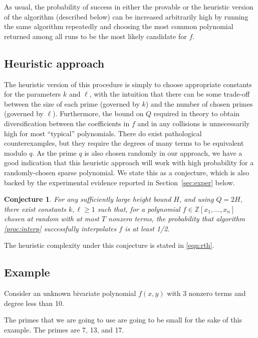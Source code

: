 \documentclass[letterpaper,10pt]{article}
\newtheorem{claim}[theorem]{Conjecture}
\newcommand{\ZZ}{\ensuremath{\mathbb{Z}}}
\begin{document}
As usual, the probability of success in either the provable or the
heuristic version of the algorithm (described below)
can be increased arbitrarily high by
running the same algorithm repeatedly and choosing the most common
polynomial returned among all runs to be the most likely candidate for
$f$.

\subsection{Heuristic approach}

The heuristic version of this procedure is simply to choose
appropriate constants for the parameters $k$ and $\ell$, with the
intuition that there can be some trade-off between the size of each prime
(governed by $k$) and the number of chosen primes (governed by $\ell$).
Furthermore, the bound on $Q$ required in theory to obtain
diversification between the coefficients in $f$ and in any collisions is
unnecessarily high for most ``typical'' polynomials. There do exist
pathological counterexamples, but they require the degrees of many terms
to be equivalent modulo $q$. As the prime $q$ is also chosen randomly in
our approach, we have a good indication that this heuristic approach
will work with high probability for a randomly-chosen sparse polynomial.
We state this as a conjecture, which is also backed by the experimental
evidence reported in Section~\ref{sec:exper} below.

\begin{claim}
  For any sufficiently large height bound $H$, and using $Q=2H$, 
  there exist constants
  $k,\ell\ge 1$ such that, for a polynomial $f\in\ZZ[x_1,\ldots,x_n]$
  chosen at random with at most $T$ nonzero terms, the probability that
  algorithm \ref{proc:interp} successfully interpolates $f$ is at least
  1/2.
\end{claim}

The heuristic complexity under this conjecture is stated in \eqref{eqn:rth}.


\subsection{Example}



 Consider an unknown bivariate
 polynomial $f(x,y)$ with 3 nonzero terms and degree less
 than 10.

The primes that we are going to use are going to be small for the sake of this 
example. The primes are  7, 13, and 17.
\end{document}
